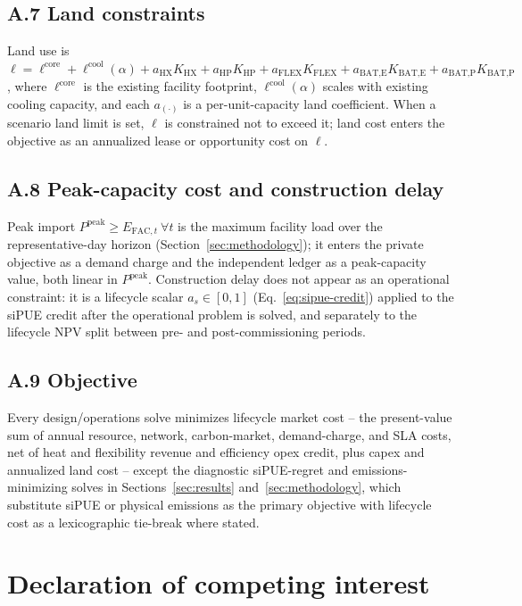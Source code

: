 \documentclass[preprint,12pt]{elsarticle}
\begin{document}
\subsection*{A.7 Land constraints}
Land use is $\ell = \ell^{\text{core}} + \ell^{\text{cool}}(\alpha) + a_{\text{HX}}K_{\text{HX}} + a_{\text{HP}}K_{\text{HP}} + a_{\text{FLEX}}K_{\text{FLEX}} + a_{\text{BAT,E}}K_{\text{BAT,E}} + a_{\text{BAT,P}}K_{\text{BAT,P}}$, where $\ell^{\text{core}}$ is the existing facility footprint, $\ell^{\text{cool}}(\alpha)$ scales with existing cooling capacity, and each $a_{(\cdot)}$ is a per-unit-capacity land coefficient. When a scenario land limit is set, $\ell$ is constrained not to exceed it; land cost enters the objective as an annualized lease or opportunity cost on $\ell$.

\subsection*{A.8 Peak-capacity cost and construction delay}
Peak import $P^{\text{peak}}\ge E_{\text{FAC},t}\ \forall t$ is the maximum facility load over the representative-day horizon (Section~\ref{sec:methodology}); it enters the private objective as a demand charge and the independent ledger as a peak-capacity value, both linear in $P^{\text{peak}}$. Construction delay does not appear as an operational constraint: it is a lifecycle scalar $a_s\in[0,1]$ (Eq.~\ref{eq:sipue-credit}) applied to the siPUE credit after the operational problem is solved, and separately to the lifecycle NPV split between pre- and post-commissioning periods.

\subsection*{A.9 Objective}
Every design/operations solve minimizes lifecycle market cost -- the present-value sum of annual resource, network, carbon-market, demand-charge, and SLA costs, net of heat and flexibility revenue and efficiency opex credit, plus capex and annualized land cost -- except the diagnostic siPUE-regret and emissions-minimizing solves in Sections~\ref{sec:results} and~\ref{sec:methodology}, which substitute siPUE or physical emissions as the primary objective with lifecycle cost as a lexicographic tie-break where stated.

\section*{Declaration of competing interest}
\end{document}
